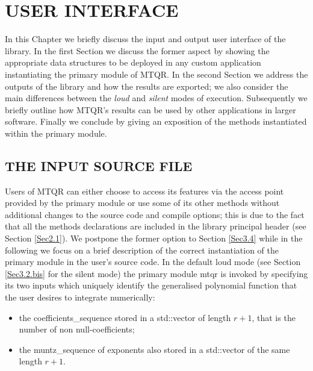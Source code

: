 \documentclass[a4paper, twosided]{book}
\begin{document}
\chapter[User interface]{\Huge \ttfamily USER INTERFACE}

In this Chapter we briefly discuss the input and output user interface of the library. In the first Section we discuss the former aspect by showing the appropriate data structures to be deployed in any custom application instantiating the primary module of MTQR. In the second Section we address the outputs of the library and how the results are exported; we also consider the main differences between the \textit{loud} and \textit{silent} modes of execution. Subsequently we briefly outline how MTQR's results can be used by other applications in larger software. Finally we conclude by giving an exposition of the methods instantiated within the primary module.

\section[The input source file]{\changefont THE INPUT SOURCE FILE}\label{Sec3.1}

\noindent
 Users of MTQR can either choose to access its features via the access point provided by the primary module or use some of its other methods without additional changes to the source code and compile options; this is due to the fact that all the methods declarations are included in the library principal header (see Section \ref{Sec2.1}). We postpone the former option to Section \ref{Sec3.4} while in the following we focus on a brief description of the correct instantiation of the primary module in the user's source code. In the default loud mode (see Section \ref{Sec3.2.bis} for the silent mode) the primary module \colorbox{poliGrayBlue}{mtqr} is invoked by specifying its two inputs which uniquely identify the generalised polynomial function that the user desires to integrate numerically:

\begin{itemize}
    \item the \colorbox{poliGrayBlue}{coefficients\_sequence} stored in a \colorbox{poliGrayBlue}{std::vector} of length $r+1$, that is the number of non null-coefficients;
    \item the \colorbox{poliGrayBlue}{muntz\_sequence} of exponents also stored in a \colorbox{poliGrayBlue}{std::vector} of the same length $r+1$.
\end{itemize}
\end{document}
